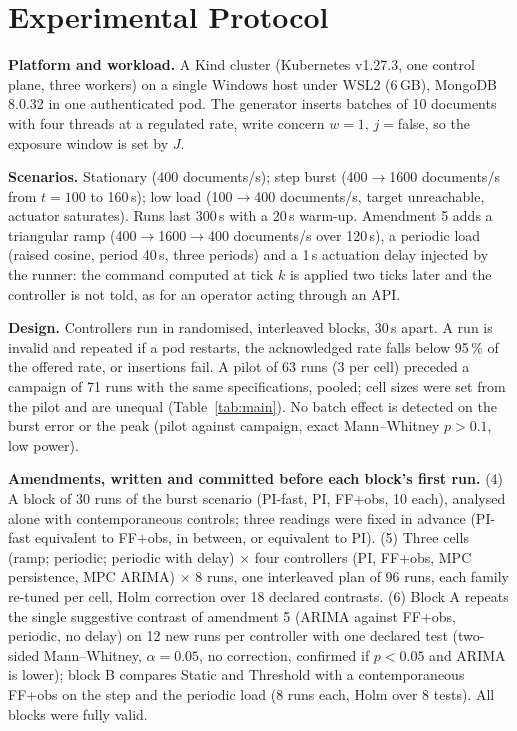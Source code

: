 \documentclass[journal]{IEEEtran}
\begin{document}
\section{Experimental Protocol}\label{sec:protocol}
\textbf{Platform and workload.} A Kind cluster (Kubernetes v1.27.3, one control plane, three workers) on a single Windows host under WSL2 (6\,GB), MongoDB 8.0.32 in one authenticated pod. The generator inserts batches of 10 documents with four threads at a regulated rate, write concern $w=1$, $j=$false, so the exposure window is set by $J$.

\textbf{Scenarios.} Stationary (400 documents/s); step burst (400$\to$1600 documents/s from $t=100$ to 160\,s); low load (100$\to$400 documents/s, target unreachable, actuator saturates). Runs last 300\,s with a 20\,s warm-up. Amendment 5 adds a triangular ramp (400$\to$1600$\to$400 documents/s over 120\,s), a periodic load (raised cosine, period 40\,s, three periods) and a 1\,s actuation delay injected by the runner: the command computed at tick $k$ is applied two ticks later and the controller is not told, as for an operator acting through an API.

\textbf{Design.} Controllers run in randomised, interleaved blocks, 30\,s apart. A run is invalid and repeated if a pod restarts, the acknowledged rate falls below 95\,\% of the offered rate, or insertions fail. A pilot of 63 runs (3 per cell) preceded a campaign of 71 runs with the same specifications, pooled; cell sizes were set from the pilot and are unequal (Table~\ref{tab:main}). No batch effect is detected on the burst error or the peak (pilot against campaign, exact Mann--Whitney $p>0.1$, low power).

\textbf{Amendments, written and committed before each block's first run.} (4) A block of 30 runs of the burst scenario (PI-fast, PI, FF+obs, 10 each), analysed alone with contemporaneous controls; three readings were fixed in advance (PI-fast equivalent to FF+obs, in between, or equivalent to PI). (5) Three cells (ramp; periodic; periodic with delay) $\times$ four controllers (PI, FF+obs, MPC persistence, MPC ARIMA) $\times$ 8 runs, one interleaved plan of 96 runs, each family re-tuned per cell, Holm correction over 18 declared contrasts. (6) Block A repeats the single suggestive contrast of amendment 5 (ARIMA against FF+obs, periodic, no delay) on 12 new runs per controller with one declared test (two-sided Mann--Whitney, $\alpha=0.05$, no correction, confirmed if $p<0.05$ and ARIMA is lower); block B compares Static and Threshold with a contemporaneous FF+obs on the step and the periodic load (8 runs each, Holm over 8 tests). All blocks were fully valid.
\end{document}
